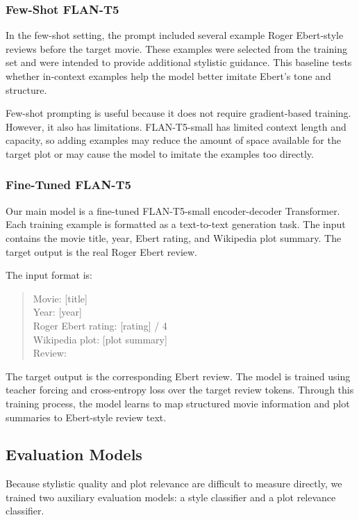 \subsubsection{Few-Shot FLAN-T5}

In the few-shot setting, the prompt included several example Roger Ebert-style reviews before the target movie. These examples were selected from the training set and were intended to provide additional stylistic guidance. This baseline tests whether in-context examples help the model better imitate Ebert's tone and structure.

Few-shot prompting is useful because it does not require gradient-based training. However, it also has limitations. FLAN-T5-small has limited context length and capacity, so adding examples may reduce the amount of space available for the target plot or may cause the model to imitate the examples too directly.

\subsubsection{Fine-Tuned FLAN-T5}

Our main model is a fine-tuned FLAN-T5-small encoder-decoder Transformer. Each training example is formatted as a text-to-text generation task. The input contains the movie title, year, Ebert rating, and Wikipedia plot summary. The target output is the real Roger Ebert review.

The input format is:

\begin{quote}
Movie: [title] \\
Year: [year] \\
Roger Ebert rating: [rating] / 4 \\
Wikipedia plot: [plot summary] \\
Review:
\end{quote}

The target output is the corresponding Ebert review. The model is trained using teacher forcing and cross-entropy loss over the target review tokens. Through this training process, the model learns to map structured movie information and plot summaries to Ebert-style review text.

\subsection{Evaluation Models}

Because stylistic quality and plot relevance are difficult to measure directly, we trained two auxiliary evaluation models: a style classifier and a plot relevance classifier.

